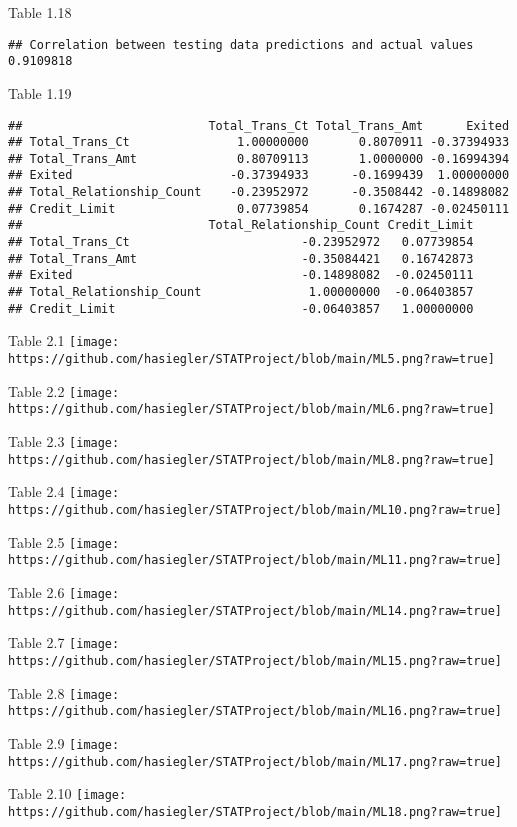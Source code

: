 \documentclass[
]{article}
\begin{document}
Table 1.18

\begin{verbatim}
## Correlation between testing data predictions and actual values 0.9109818
\end{verbatim}

Table 1.19

\begin{verbatim}
##                          Total_Trans_Ct Total_Trans_Amt      Exited
## Total_Trans_Ct               1.00000000       0.8070911 -0.37394933
## Total_Trans_Amt              0.80709113       1.0000000 -0.16994394
## Exited                      -0.37394933      -0.1699439  1.00000000
## Total_Relationship_Count    -0.23952972      -0.3508442 -0.14898082
## Credit_Limit                 0.07739854       0.1674287 -0.02450111
##                          Total_Relationship_Count Credit_Limit
## Total_Trans_Ct                        -0.23952972   0.07739854
## Total_Trans_Amt                       -0.35084421   0.16742873
## Exited                                -0.14898082  -0.02450111
## Total_Relationship_Count               1.00000000  -0.06403857
## Credit_Limit                          -0.06403857   1.00000000
\end{verbatim}

Table 2.1
\texttt{[image: https://github.com/hasiegler/STATProject/blob/main/ML5.png?raw=true]}

Table 2.2
\texttt{[image: https://github.com/hasiegler/STATProject/blob/main/ML6.png?raw=true]}

Table 2.3
\texttt{[image: https://github.com/hasiegler/STATProject/blob/main/ML8.png?raw=true]}

Table 2.4
\texttt{[image: https://github.com/hasiegler/STATProject/blob/main/ML10.png?raw=true]}

Table 2.5
\texttt{[image: https://github.com/hasiegler/STATProject/blob/main/ML11.png?raw=true]}

Table 2.6
\texttt{[image: https://github.com/hasiegler/STATProject/blob/main/ML14.png?raw=true]}

Table 2.7
\texttt{[image: https://github.com/hasiegler/STATProject/blob/main/ML15.png?raw=true]}

Table 2.8
\texttt{[image: https://github.com/hasiegler/STATProject/blob/main/ML16.png?raw=true]}

Table 2.9
\texttt{[image: https://github.com/hasiegler/STATProject/blob/main/ML17.png?raw=true]}

Table 2.10
\texttt{[image: https://github.com/hasiegler/STATProject/blob/main/ML18.png?raw=true]}
\end{document}
